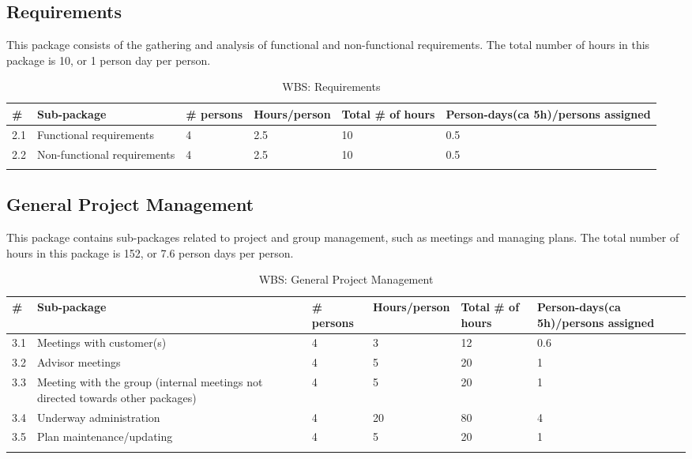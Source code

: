 \subsection{Requirements}
This package consists of the gathering and analysis of functional and non-functional requirements. The total number of hours in this package is 10, or 1 person day per person.
\begin{longtable}{|p{0.7cm}|p{3cm}|p{1.8cm}|p{2.5cm}|p{2cm}|p{2.8cm}|}
\hline
\# & Sub-package & \# persons & Hours/person & Total \# of hours & Person-days(ca 5h)/persons assigned\\ 
\hline
2.1 & Functional requirements & 4 & 2.5 & 10 & 0.5\\ 
\hline
2.2 & Non-functional requirements & 4 & 2.5 & 10 & 0.5\\ 
\hline

\caption{WBS: Requirements}
\end{longtable}

\subsection{General Project Management}
This package contains sub-packages related to project and group management, such as meetings and managing plans. The total number of hours in this package is 152, or 7.6 person days per person.
\begin{longtable}{|p{0.7cm}|p{3cm}|p{1.8cm}|p{2.5cm}|p{2cm}|p{2.8cm}|}
\hline
\# & Sub-package & \# persons & Hours/person & Total \# of hours & Person-days(ca 5h)/persons assigned\\ 
\hline
3.1 & Meetings with customer(s)  & 4 & 3 & 12 & 0.6\\ 
\hline
3.2 & Advisor meetings  & 4 & 5 & 20 & 1\\ 
\hline
3.3 & Meeting with the group (internal meetings not directed towards other packages) & 4 & 5 & 20 & 1\\ 
\hline
3.4 & Underway administration & 4 & 20 & 80 & 4\\ 
\hline
3.5 & Plan maintenance/updating & 4 & 5 & 20 & 1\\ 
\hline

\caption{WBS: General Project Management}
\end{longtable}

